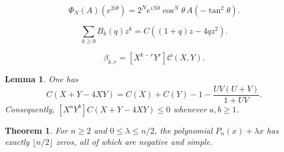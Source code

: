 \documentclass[10pt,a4paper]{amsart}
\newtheorem{theorem}{Theorem}
\newtheorem{lemma}{Lemma}
\begin{document}
\begin{equation}\label{eq:PhiUnitCircle}
\Phi_N(A)(e^{2i\theta})
=2^Ne^{iN\theta}\cos^N\theta\,A(-\tan^2\theta).
\end{equation}

\begin{equation}\label{eq:Bgenfun}
\sum_{k\ge0}B_k(q)z^k=C((1+q)z-4qz^2).
\end{equation}

\begin{equation}\label{eq:betaMixedCoeff}
\beta_{k,r}=[X^{k-r}Y^r]\mathcal C(X,Y).
\end{equation}

\begin{lemma}\label{lem:twoVariableCatalan}
One has
\begin{equation}\label{eq:CXYdecomp}
C(X+Y-4XY)
=C(X)+C(Y)-1-\frac{UV(U+V)}{1+UV}.
\end{equation}
Consequently, $[X^aY^b]C(X+Y-4XY)\le0$ whenever $a,b\ge1$.
\end{lemma}

\begin{theorem}\label{thm:KLpencil}
For $n\ge2$ and $0\le\lambda\le n/2$, the polynomial
$P_n(x)+\lambda x$ has exactly $\lfloor n/2\rfloor$ zeros, all of
which are negative and simple.
\end{theorem}
\end{document}
